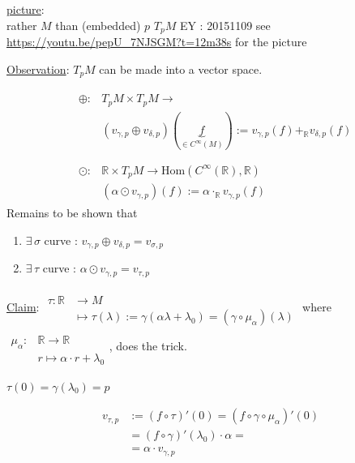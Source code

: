 	\underline{picture}:\\
	rather $M$ than (embedded) $p$ $T_pM$ EY : 20151109 see \url{https://youtu.be/pepU_7NJSGM?t=12m38s} for the picture
	
	\underline{Observation}: $T_pM$ can be made into a vector space. 
	
	\[
	\begin{aligned}
	& \begin{aligned}
	\oplus : & T_pM \times T_pM \to   \\
	& (v_{\gamma,p} \oplus v_{\delta,p})(\underbrace{f}_{ \in C^{\infty}(M)} ) := v_{\gamma,p}(f) +_{\mathbb{R}} v_{\delta,p}(f) \\
	\end{aligned} \\
	& \begin{aligned}
	\odot : & \mathbb{R} \times T_pM \to \text{Hom}(C^{\infty}(\mathbb{R}),\mathbb{R}) \\
	& (\alpha \odot v_{\gamma,p} )(f) := \alpha \cdot_{\mathbb{R}}  v_{\gamma, p}(f)
	\end{aligned}
	\end{aligned}
	\]
	Remains to be shown that 
	\begin{enumerate}
		\item[(i)] $\exists \, \sigma$ curve : $v_{\gamma,p} \oplus v_{\delta,p} = v_{\sigma,p}$
		\item[(ii)] $\exists \, \tau $ curve : $\alpha \odot v_{\gamma,p} = v_{\tau,p}$
	\end{enumerate}
	
	\underline{Claim}: $\begin{aligned} & \quad \\ 
	\tau : \mathbb{R}&  \to M  \\
	& \mapsto \tau(\lambda) := \gamma(\alpha  \lambda + \lambda_0) = (\gamma \circ \mu_{\alpha})(\lambda)
	\end{aligned}$
	where $\begin{aligned} & \quad \\
	\mu_{\alpha}: & \mathbb{R} \to \mathbb{R} \\ 
	& r \mapsto \alpha \cdot r + \lambda_0 \end{aligned}$, 
	does the trick.
	
	$\tau(0) = \gamma(\lambda_0) =p$
	
	\[
	\begin{aligned}
	v_{\tau,p} & := (f\circ \tau)'(0) = (f\circ \gamma \circ \mu_{\alpha} )'(0) \\ 
	& =  (f\circ \gamma)'(\lambda_0) \cdot \alpha = \\
	& = \alpha \cdot v_{\gamma,p}
	\end{aligned}
	\]
	
